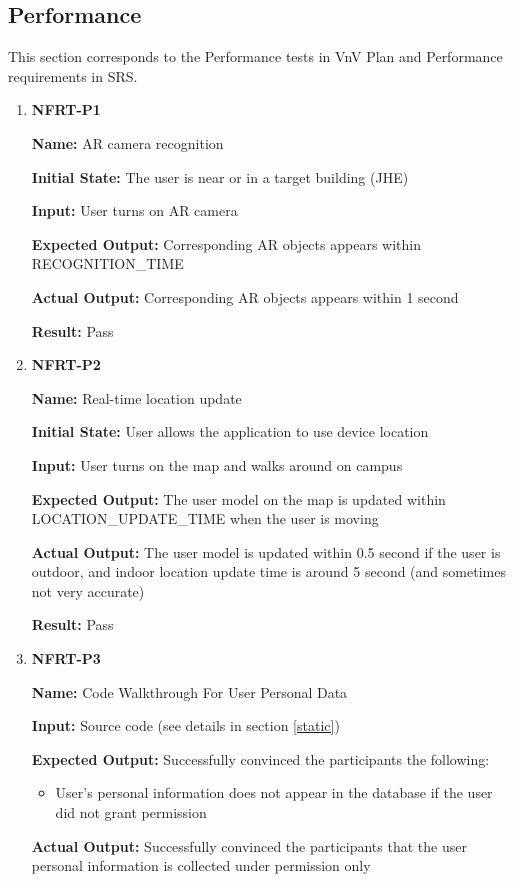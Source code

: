 \documentclass[12pt, titlepage]{article}
\begin{document}
\subsection{Performance}
This section corresponds to the Performance tests in VnV Plan and Performance requirements in SRS.
\begin{enumerate}
\item \textbf{NFRT-P1}

\textbf{Name:} AR camera recognition

\textbf{Initial State:} The user is near or in a target building (JHE)
					
\textbf{Input:} User turns on AR camera
					
\textbf{Expected Output:} Corresponding AR objects appears within RECOGNITION\_TIME

\textbf{Actual Output:} Corresponding AR objects appears within 1 second

\textbf{Result:} Pass

\item \textbf{NFRT-P2}

\textbf{Name:} Real-time location update

\textbf{Initial State:} User allows the application to use device location
					
\textbf{Input:} User turns on the map and walks around on campus
					
\textbf{Expected Output:} The user model on the map is updated within  LOCATION\_UPDATE\_TIME when the user is moving

\textbf{Actual Output:} The user model is updated within 0.5 second if the user is outdoor, and indoor location update time is around 5 second (and sometimes not very accurate)

\textbf{Result:} Pass

\item \textbf{NFRT-P3}

\textbf{Name:} Code Walkthrough For User Personal Data

\textbf{Input:} Source code (see details in section \ref{static})

\textbf{Expected Output:} Successfully convinced the participants the following:
\begin{itemize}
  \item User's personal information does not appear in the database if the user did not grant permission
\end{itemize}

\textbf{Actual Output:} Successfully convinced the participants that the user personal information is collected under permission only


\end{enumerate}
\end{document}
